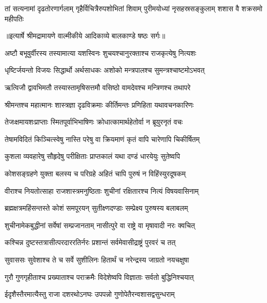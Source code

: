 \fourlineindentedshloka
{तां सत्यनामां दृढतोरणार्गलाम्}
{गृहैर्विचित्रैरुपशोभितां शिवाम्}
{पुरीमयोध्यां नृसहस्रसङ्कुलाम्}
{शशास वै शक्रसमो महीपतिः} %


{॥इत्यार्षे श्रीमद्रामायणे वाल्मीकीये आदिकाव्ये बालकाण्डे षष्ठः सर्गः॥}


\twolineshloka
{अष्टौ बभूवुर्वीरस्य तस्यामात्या यशस्विनः}
{शुचयश्चानुरक्ताश्च राजकृत्येषु नित्यशः} %

\twolineshloka
{धृष्टिर्जयन्तो विजयः सिद्धार्थो अर्थसाधकः}
{अशोको मन्त्रपालश्च सुमन्त्रश्चाष्टमोऽभवत्} %

\twolineshloka
{ऋत्विजौ द्वावभिमतौ तस्यास्तामृषिसत्तमौ}
{वसिष्ठो वामदेवश्च मन्त्रिणश्च तथापरे} %

\twolineshloka
{श्रीमन्तश्च महात्मानः शास्त्रज्ञा दृढविक्रमाः}
{कीर्तिमन्तः प्रणिहिता यथावचनकारिणः} %

\twolineshloka
{तेजःक्षमायशःप्राप्ताः स्मितपूर्वाभिभाषिणः}
{क्रोधात्कामार्थहेतोर्वा न ब्रूयुरनृतं वचः} %

\twolineshloka
{तेषामविदितं किञ्चित्स्वेषु नास्ति परेषु वा}
{क्रियमाणं कृतं वापि चारेणापि चिकीर्षितम्} %

\twolineshloka
{कुशला व्यवहारेषु सौहृदेषु परीक्षिताः}
{प्राप्तकालं यथा दण्डं धारयेयुः सुतेष्वपि} %

\twolineshloka
{कोशसङ्ग्रहणे युक्ता बलस्य च परिग्रहे}
{अहितं चापि पुरुषं न विहिंस्युरदूषकम्} %

\twolineshloka
{वीराश्च नियतोत्साहा राजशास्त्रमनुष्ठिताः}
{शुचीनां रक्षितारश्च नित्यं विषयवासिनाम्} %

\twolineshloka
{ब्रह्मक्षत्रमहिंसन्तस्ते कोशं समपूरयन्}
{सुतीक्ष्णदण्डाः सम्प्रेक्ष्य पुरुषस्य बलाबलम्} %

\twolineshloka
{शुचीनामेकबुद्धीनां सर्वेषां सम्प्रजानताम्}
{नासीत्पुरे वा राष्ट्रे वा मृषावादी नरः क्वचित्} %

\twolineshloka
{कश्चिन्न दुष्टस्तत्रासीत्परदाररतिर्नरः}
{प्रशान्तं सर्वमेवासीद्राष्ट्रं पुरवरं च तत्} %

\twolineshloka
{सुवाससः सुवेशाश्च ते च सर्वे सुशीलिनः}
{हितार्थं च नरेन्द्रस्य जाग्रतो नयचक्षुषा} %

\twolineshloka
{गुरौ गुणगृहीताश्च प्रख्याताश्च पराक्रमैः}
{विदेशेष्वपि विज्ञाताः सर्वतो बुद्धिनिश्चयात्} %

\twolineshloka
{ईदृशैस्तैरमात्यैस्तु राजा दशरथोऽनघः}
{उपपन्नो गुणोपेतैरन्वशासद्वसुन्धराम्} %

